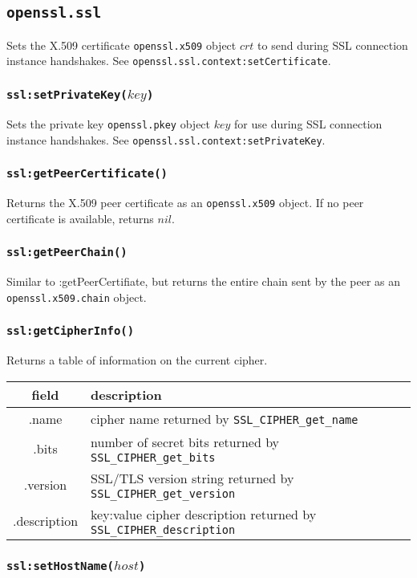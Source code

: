 \documentclass[11pt, oneside]{memoir}
\newcommand*{\fn}[1]{\texttt{#1}\xspace}
\newcommand*{\module}[1]{\texttt{#1}\xspace}
\newcounter{toccols}
\newenvironment{Module}[1]{
	\subsection{\texttt{#1}}
	\addtocontents{toc}{
		\protect\begin{multicols}{\value{toccols}}
	}
}{
	\addtocontents{toc}{\protect\end{multicols}}
}
\begin{document}
\begin{Module}{openssl.ssl}
Sets the X.509 certificate \module{openssl.x509} object $crt$ to send during SSL connection instance handshakes.
See \fn{openssl.ssl.context:setCertificate}.

\subsubsection[\fn{ssl:setPrivateKey}]{\fn{ssl:setPrivateKey($key$)}}

Sets the private key \module{openssl.pkey} object $key$ for use during SSL connection instance handshakes.
See \fn{openssl.ssl.context:setPrivateKey}.

\subsubsection[\fn{ssl:getPeerCertificate}]{\fn{ssl:getPeerCertificate()}}

Returns the X.509 peer certificate as an \module{openssl.x509} object. If no peer certificate is available, returns $nil$.

\subsubsection[\fn{ssl:getPeerChain}]{\fn{ssl:getPeerChain()}}

Similar to :getPeerCertifiate, but returns the entire chain sent by the peer as an \module{openssl.x509.chain} object.

\subsubsection[\fn{ssl:getCipherInfo}]{\fn{ssl:getCipherInfo()}}

Returns a table of information on the current cipher.

\begin{tabular}{ c | l }
field & description\\\hline
.name & cipher name returned by \fn{SSL\_CIPHER\_get\_name}\\
.bits & number of secret bits returned by \fn{SSL\_CIPHER\_get\_bits}\\
.version & SSL/TLS version string returned by \fn{SSL\_CIPHER\_get\_version}\\
.description & key:value cipher description returned by \fn{SSL\_CIPHER\_description}
\end{tabular}

\subsubsection[\fn{ssl:setHostName}]{\fn{ssl:setHostName($host$)}}


\end{Module}
\end{document}
